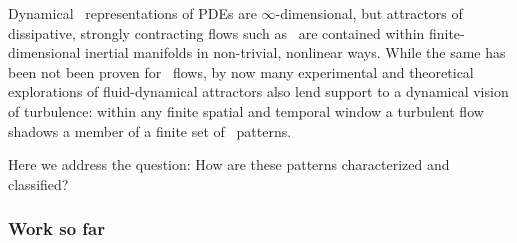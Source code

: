 


Dynamical \statesp\ representations of PDEs are $\infty$-dimensional, but
attractors of dissipative, strongly contracting flows such as \KS\ are
contained within finite-dimensional inertial manifolds%
 in non-trivial, nonlinear ways. While the same has been
not been proven for \NS\ flows, by now many
experimental and theoretical explorations of fluid-dynamical attractors
also lend support to a dynamical vision of turbulence: within any finite spatial
and temporal window a turbulent flow shadows a member of a finite set
of \spt\ patterns.

Here we address the question: How are these
patterns characterized and classified?


\subsubsection{Work so far}



